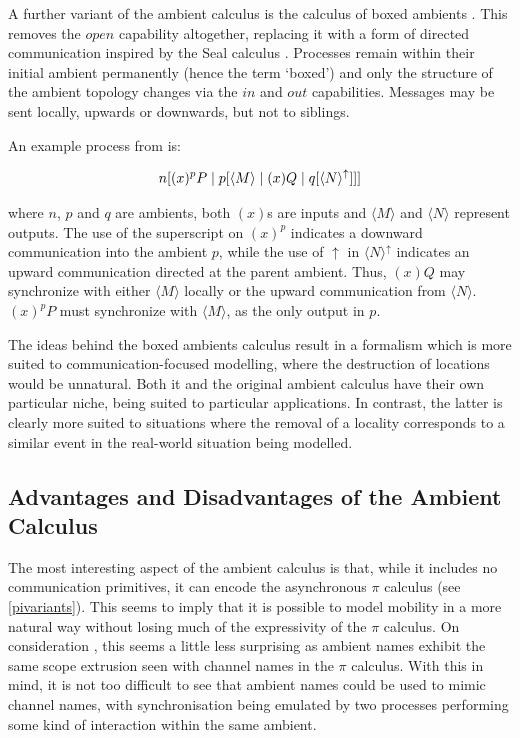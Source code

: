 A further variant of the ambient calculus is the calculus of boxed
ambients \cite*{boxedamb01}.  This removes the $open$ capability
altogether, replacing it with a form of directed communication
inspired by the Seal calculus \cite{seal}.  Processes remain within
their initial ambient permanently (hence the term `boxed') and only
the structure of the ambient topology changes via the $in$ and $out$
capabilities.  Messages may be sent locally, upwards or downwards, but
not to siblings.

An example process from \cite{boxedamb01} is:

\begin{equation}
n[(x)^pP \;|\; p[\langle M \rangle \;|\; (x)Q \;|\; q[\langle N
\rangle^\uparrow ]]]
\end{equation}

\noindent where $n$, $p$ and $q$ are ambients, both $(x)$s are inputs
and $\langle M \rangle$ and $\langle N \rangle$ represent outputs.
The use of the superscript on $(x)^p$ indicates a downward
communication into the ambient $p$, while the use of $\uparrow$ in
$\langle N \rangle^\uparrow$ indicates an upward communication
directed at the parent ambient.  Thus, $(x)Q$ may synchronize with
either $\langle M \rangle$ locally or the upward communication from
$\langle N \rangle$.  $(x)^pP$ must synchronize with $\langle M
\rangle$, as the only output in $p$.

The ideas behind the boxed ambients calculus result in a formalism which
is more suited to communication-focused modelling, where the destruction
of locations would be unnatural.  Both it and the original ambient
calculus have their own particular niche, being suited to particular
applications.  In contrast, the latter is clearly more suited to
situations where the removal of a locality corresponds to a similar
event in the real-world situation being modelled.

\subsection{Advantages and Disadvantages of the Ambient Calculus}
\label{amblimit}

The most interesting aspect of the ambient calculus is that, while it
includes no communication primitives, it can encode the asynchronous
$\pi$ calculus (see \ref{pivariants}).  This seems to imply that it is
possible to model mobility in a more natural way without losing much of
the expressivity of the $\pi$ calculus.  On consideration , this seems a
little less surprising as ambient names exhibit the same scope extrusion
seen with channel names in the $\pi$ calculus.  With this in mind, it is
not too difficult to see that ambient names could be used to mimic
channel names, with synchronisation being emulated by two processes
performing some kind of interaction within the same ambient.

